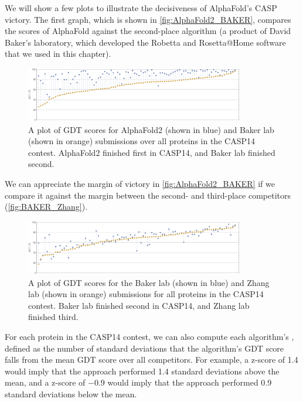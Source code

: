 We will show a few plots to illustrate the decisiveness of AlphaFold's CASP victory. The first graph, which is shown in \autoref{fig:AlphaFold2_BAKER}, compares the scores of AlphaFold against the second-place algorithm (a product of David Baker's laboratory, which developed the Robetta and Rosetta@Home software that we used in this chapter).\\

\begin{figure}[h]
	\centering
	\mySfFamily
	\includegraphics[width = 0.85\textwidth]{../images/AlphaFold2_BAKER.png}
	\caption{A plot of GDT scores for AlphaFold2 (shown in blue) and Baker lab (shown in orange) submissions over all proteins in the CASP14 contest. AlphaFold2 finished first in CASP14, and Baker lab finished second.}
	\label{fig:AlphaFold2_BAKER}
\end{figure}

We can appreciate the margin of victory in \autoref{fig:AlphaFold2_BAKER} if we compare it against the margin between the second- and third-place competitors (\autoref{fig:BAKER_Zhang}).\\

\begin{figure}[h]
	\centering
	\mySfFamily
	\includegraphics[width = 0.85\textwidth]{../images/BAKER_Zhang.png}
	\caption{A plot of GDT scores for the Baker lab (shown in blue) and Zhang lab (shown in orange) submissions for all proteins in the CASP14 contest. Baker lab finished second in CASP14, and Zhang lab finished third.}
	\label{fig:BAKER_Zhang}
\end{figure}

For each protein in the CASP14 contest, we can also compute each algorithm's , defined as the number of standard deviations that the algorithm's GDT score falls from the mean GDT score over all competitors. For example, a z-score of 1.4 would imply that the approach performed 1.4 standard deviations above the mean, and a z-score of $-0.9$ would imply that the approach performed 0.9 standard deviations below the mean.

